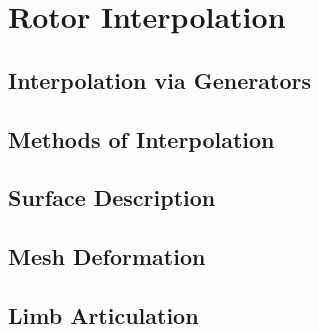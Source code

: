 \chapter{Rotor Interpolation}

\section{Interpolation via Generators}

\section{Methods of Interpolation}

\section{Surface Description}

\section{Mesh Deformation}

\section{Limb Articulation}
